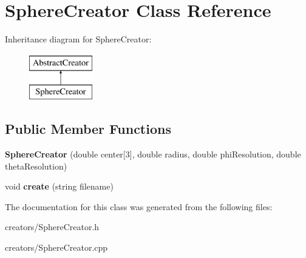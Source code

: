 \hypertarget{class_sphere_creator}{}\section{Sphere\+Creator Class Reference}
\label{class_sphere_creator}
Inheritance diagram for Sphere\+Creator\+:\begin{figure}[H]
\begin{center}
\leavevmode
\includegraphics[height=2.000000cm]{class_sphere_creator}
\end{center}
\end{figure}
\subsection*{Public Member Functions}
\begin{DoxyCompactItemize}
\item 
\mbox{\label{class_sphere_creator_a024fb7eb2c18c6785e68365e65164974}} 
{\bfseries Sphere\+Creator} (double center\mbox{[}3\mbox{]}, double radius, double phi\+Resolution, double theta\+Resolution)
\item 
\mbox{\label{class_sphere_creator_a35e16f36b147b2fb2705d9413f5a963e}} 
void {\bfseries create} (string filename)
\end{DoxyCompactItemize}


The documentation for this class was generated from the following files\+:\begin{DoxyCompactItemize}
\item 
creators/Sphere\+Creator.\+h\item 
creators/Sphere\+Creator.\+cpp\end{DoxyCompactItemize}
